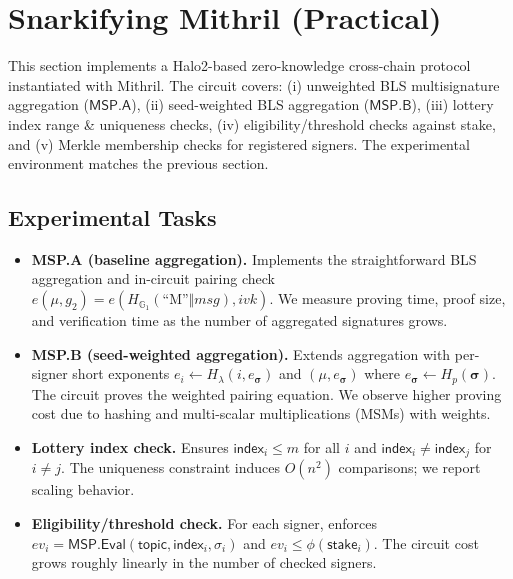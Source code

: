 \documentclass{article}
\begin{document}

\section{Snarkifying Mithril (Practical)}
\label{sec:snarkifying-mithril-practical}

This section implements a Halo2-based zero-knowledge cross-chain protocol instantiated with Mithril. The circuit covers: (i) unweighted BLS multisignature aggregation ($\mathsf{MSP.A}$), (ii) seed-weighted BLS aggregation ($\mathsf{MSP.B}$), (iii) lottery index range \& uniqueness checks, (iv) eligibility/threshold checks against stake, and (v) Merkle membership checks for registered signers. The experimental environment matches the previous section.

\subsection{Experimental Tasks}
\begin{itemize}
  \item \textbf{MSP.A (baseline aggregation).} Implements the straightforward BLS aggregation and in-circuit pairing check $e(\mu,g_2)=e(H_{\mathbb{G}_1}(\text{``M''}\Vert msg), ivk)$. We measure proving time, proof size, and verification time as the number of aggregated signatures grows.
  \item \textbf{MSP.B (seed-weighted aggregation).} Extends aggregation with per-signer short exponents $e_i \leftarrow H_\lambda(i,e_{\boldsymbol{\sigma}})$ and $(\mu,e_{\boldsymbol{\sigma}})$ where $e_{\boldsymbol{\sigma}}\leftarrow H_p(\boldsymbol{\sigma})$. The circuit proves the weighted pairing equation. We observe higher proving cost due to hashing and multi-scalar multiplications (MSMs) with weights.
  \item \textbf{Lottery index check.} Ensures $\mathsf{index}_i\!\le m$ for all $i$ and $\mathsf{index}_i\!\ne\!\mathsf{index}_j$ for $i\ne j$. The uniqueness constraint induces $O(n^2)$ comparisons; we report scaling behavior.
  \item \textbf{Eligibility/threshold check.} For each signer, enforces $ev_i=\mathsf{MSP.Eval}(\mathsf{topic},\mathsf{index}_i,\sigma_i)$ and $ev_i \le \phi(\mathsf{stake}_i)$. The circuit cost grows roughly linearly in the number of checked signers.
\end{itemize}
\end{document}
